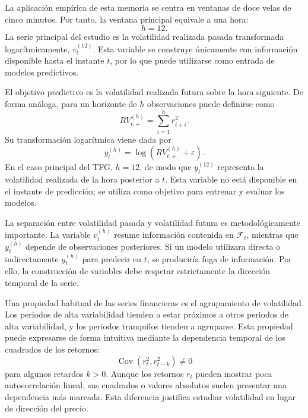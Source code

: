 La aplicación empírica de esta memoria se centra en ventanas de doce velas de cinco minutos. Por tanto, la ventana principal equivale a una hora:
\begin{equation}
    h = 12.
\end{equation}
La serie principal del estudio es la volatilidad realizada pasada transformada logarítmicamente, \(v_t^{(12)}\). Esta variable se construye únicamente con información disponible hasta el instante \(t\), por lo que puede utilizarse como entrada de modelos predictivos.

El objetivo predictivo es la volatilidad realizada futura sobre la hora siguiente. De forma análoga, para un horizonte de \(h\) observaciones puede definirse como
\begin{equation}
    RV_{t,+}^{(h)} = \sum_{i=1}^{h} r_{t+i}^{2}.
\end{equation}
Su transformación logarítmica viene dada por
\begin{equation}
    y_t^{(h)} = \log\left(RV_{t,+}^{(h)}+\varepsilon\right).
\end{equation}
En el caso principal del TFG, \(h=12\), de modo que \(y_t^{(12)}\) representa la volatilidad realizada de la hora posterior a \(t\). Esta variable no está disponible en el instante de predicción; se utiliza como objetivo para entrenar y evaluar los modelos.

La separación entre volatilidad pasada y volatilidad futura es metodológicamente importante. La variable \(v_t^{(h)}\) resume información contenida en \(\mathcal{F}_t\), mientras que \(y_t^{(h)}\) depende de observaciones posteriores. Si un modelo utilizara directa o indirectamente \(y_t^{(h)}\) para predecir en \(t\), se produciría fuga de información. Por ello, la construcción de variables debe respetar estrictamente la dirección temporal de la serie.

Una propiedad habitual de las series financieras es el agrupamiento de volatilidad. Los periodos de alta variabilidad tienden a estar próximos a otros periodos de alta variabilidad, y los periodos tranquilos tienden a agruparse. Esta propiedad puede expresarse de forma intuitiva mediante la dependencia temporal de los cuadrados de los retornos:
\begin{equation}
    \operatorname{Cov}(r_t^2,r_{t-k}^2) \neq 0
\end{equation}
para algunos retardos \(k>0\). Aunque los retornos \(r_t\) pueden mostrar poca autocorrelación lineal, sus cuadrados o valores absolutos suelen presentar una dependencia más marcada. Esta diferencia justifica estudiar volatilidad en lugar de dirección del precio.

